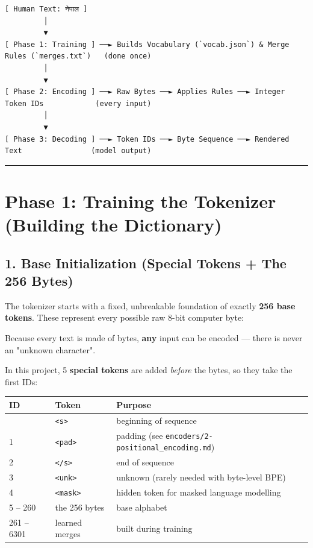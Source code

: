 \documentclass[11pt,a4paper,oneside]{report}
\begin{document}
\begin{Verbatim}[fontsize=\scriptsize]
[ Human Text: नेपाल ]
         │
         ▼
[ Phase 1: Training ] ──► Builds Vocabulary (`vocab.json`) & Merge Rules (`merges.txt`)   (done once)
         │
         ▼
[ Phase 2: Encoding ] ──► Raw Bytes ──► Applies Rules ──► Integer Token IDs            (every input)
         │
         ▼
[ Phase 3: Decoding ] ──► Token IDs ──► Byte Sequence ──► Rendered Text                (model output)
\end{Verbatim}

\begin{center}\rule{0.5\linewidth}{0.5pt}\end{center}

\section{Phase 1: Training the Tokenizer (Building the Dictionary)}\label{phase-1-training-the-tokenizer-building-the-dictionary}

\subsection{1. Base Initialization (Special Tokens + The 256 Bytes)}\label{1-base-initialization-special-tokens--the-256-bytes}

The tokenizer starts with a fixed, unbreakable foundation of exactly \textbf{256 base tokens}. These represent every possible raw 8-bit computer byte:

\begin{center}\end{center}

Because every text is made of bytes, \textbf{any} input can be encoded --- there is never an "unknown character".

In this project, 5 \textbf{special tokens} are added \emph{before} the bytes, so they take the first IDs:

{\def\LTcaptype{none} %
\begin{longtable}[]{@{}lll@{}}
\toprule\noalign{}
ID & Token & Purpose \\
\midrule\noalign{}
\endhead
\bottomrule\noalign{}
\endlastfoot
0 & \texttt{\textless{}s\textgreater{}} & beginning of sequence \\
1 & \texttt{\textless{}pad\textgreater{}} & padding (see \texttt{encoders/\allowbreak{}2-positional\_\allowbreak{}encoding.\allowbreak{}md}) \\
2 & \texttt{\textless{}/\allowbreak{}s\textgreater{}} & end of sequence \\
3 & \texttt{\textless{}unk\textgreater{}} & unknown (rarely needed with byte-level BPE) \\
4 & \texttt{\textless{}mask\textgreater{}} & hidden token for masked language modelling \\
5 -- 260 & the 256 bytes & base alphabet \\
261 -- 6301 & learned merges & built during training \\
\end{longtable}
}
\end{document}
